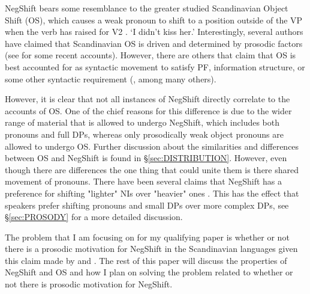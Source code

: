 \documentclass[12pt, letterpaper]{article}
\begin{document}
NegShift bears some resemblance to the greater studied Scandinavian Object Shift (OS), which causes a weak pronoun to shift to a position outside of the VP when the verb has raised for V2 \citep{holmbergWordOrderSyntactic1986,holmbergRemarksHolmbergGeneralization1999}.
	 
	\glt `I didn't kiss her.'   
	\z  
Interestingly, several authors have claimed that Scandinavian OS is driven and determined by prosodic factors (see \cite{erteschik-shirSoundPatternsSyntax2005,erteschik-shirScandinavianObjectShift2017,erteschik-shirVariationMainlandScandinavian2020,brinkerhoffMATCHINGPhrasesNorwegian2021} for some recent accounts). However, there are others that claim that OS is best accounted for as syntactic movement to satisfy PF, information structure, or some other syntactic requirement (\cite{holmbergRemarksHolmbergGeneralization1999,thrainssonObjectShiftScrambling2001,bentzenObjectShiftSpoken2013}, among many others). 

However, it is clear that not all instances of NegShift directly correlate to the accounts of OS. One of the chief reasons for this difference is due to the wider range of material that is allowed to undergo NegShift, which includes both pronouns and full DPs, whereas only prosodically weak object pronouns are allowed to undergo OS. Further discussion about the similarities and differences between OS and NegShift is found in §\ref{sec:DISTRIBUTION}. However, even though there are differences the one thing that could unite them is there shared movement of pronouns. There have been several claims that NegShift has a preference for shifting "lighter" NIs over "heavier" ones \citep{christensenInterfacesNegationSyntax2005,penkaNegativeIndefinites2011}. This has the effect that speakers prefer shifting pronouns and small DPs over more complex DPs, see §\ref{sec:PROSODY} for a more detailed discussion. 

The problem that I am focusing on for my qualifying paper is whether or not there is a prosodic motivation for NegShift in the Scandinavian languages given this claim made by \citet{christensenInterfacesNegationSyntax2005} and \citet{penkaNegativeIndefinites2011}. The rest of this paper will discuss the properties of NegShift and OS and how I plan on solving the problem related to whether or not there is prosodic motivation for NegShift. 
\end{document}
